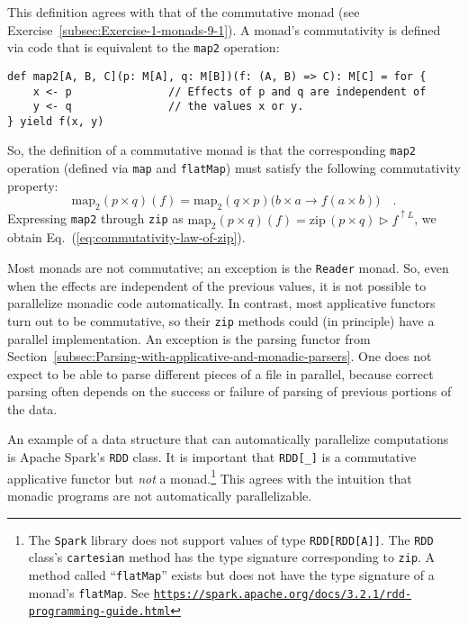 This definition agrees with that of the commutative monad (see Exercise~\ref{subsec:Exercise-1-monads-9-1}).
A monad\textsf{'}s commutativity is defined via code that is equivalent to
the \lstinline!map2! operation:\texttt{\textcolor{blue}{\footnotesize{}}}
\begin{lstlisting}
def map2[A, B, C](p: M[A], q: M[B])(f: (A, B) => C): M[C] = for {
    x <- p               // Effects of p and q are independent of
    y <- q               // the values x or y.
} yield f(x, y)
\end{lstlisting}
 So, the definition of a commutative monad is that the corresponding
\lstinline!map2! operation (defined via \lstinline!map! and \lstinline!flatMap!)
must satisfy the following commutativity property: 
\[
\text{map}_{2}(p\times q)(f)=\text{map}_{2}(q\times p)\big(b\times a\rightarrow f(a\times b)\big)\quad.
\]
Expressing \lstinline!map2! through \lstinline!zip! as $\text{map}_{2}(p\times q)(f)=\text{zip}\,(p\times q)\triangleright f^{\uparrow L}$,
we obtain Eq.~(\ref{eq:commutativity-law-of-zip}).

Most monads are not commutative; an exception is the \lstinline!Reader!
monad. So, even when the effects are independent of the previous values,
it is not possible to parallelize monadic code automatically. In contrast,
most applicative functors turn out to be commutative, so their \lstinline!zip!
methods could (in principle) have a parallel implementation. An exception
is the parsing functor from Section~\ref{subsec:Parsing-with-applicative-and-monadic-parsers}.
One does not expect to be able to parse different pieces of a file
in parallel, because correct parsing often depends on the success
or failure of parsing of previous portions of the data.

An example of a data structure that can automatically parallelize
computations is Apache Spark\textsf{'}s \lstinline!RDD! class.
It is important that \lstinline!RDD[_]! is a commutative applicative
functor but \emph{not} a monad.\footnote{The \texttt{Spark} library does not support values of type \lstinline!RDD[RDD[A]]!.
The \lstinline!RDD! class\textsf{'}s \lstinline!cartesian! method has the
type signature corresponding to \lstinline!zip!. A method called
\textsf{``}\lstinline!flatMap!\textsf{''} exists but does not have the type signature
of a monad\textsf{'}s \lstinline!flatMap!. See \texttt{\href{https://spark.apache.org/docs/3.2.1/rdd-programming-guide.html}{https://spark.apache.org/docs/3.2.1/rdd-programming-guide.html}}} This agrees with the intuition that monadic programs are not automatically
parallelizable.


